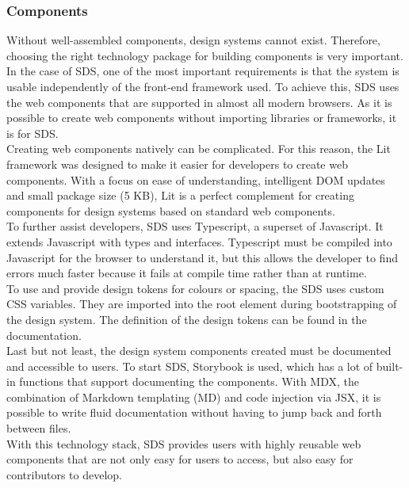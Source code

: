 \subsubsection*{Components} \label{sds-component}
Without well-assembled components, design systems cannot exist. Therefore, choosing the right technology package for building components is very important. 
In the case of SDS, one of the most important requirements is that the system is usable independently of the front-end framework used. To achieve this, SDS uses the web components that are supported in almost all modern browsers. As it is possible to create web components without importing libraries or frameworks, it is for SDS. \citep{mdn_web_component_nodate} \\
Creating web components natively can be complicated. For this reason, the Lit framework was designed to make it easier for developers to create web components. With a focus on ease of understanding, intelligent DOM updates and small package size (5 KB), Lit is a perfect complement for creating components for design systems based on standard web components. \citep{lit_nodate} \\
To further assist developers, SDS uses Typescript, a superset of Javascript. It extends Javascript with types and interfaces. Typescript must be compiled into Javascript for the browser to understand it, but this allows the developer to find errors much faster because it fails at compile time rather than at runtime. \citep{microsoft_typescript_nodate} \\
To use and provide design tokens for colours or spacing, the SDS uses custom CSS variables. They are imported into the root element during bootstrapping of the design system. The definition of the design tokens can be found in the documentation. \citep{mdn_css_vars_nodate} \\
Last but not least, the design system components created must be documented and accessible to users. To start SDS, Storybook is used, which has a lot of built-in functions that support documenting the components. With MDX, the combination of Markdown templating (MD) and code injection via JSX, it is possible to write fluid documentation without having to jump back and forth between files. \citep{otander_markdown_2017} \\
With this technology stack, SDS provides users with highly reusable web components that are not only easy for users to access, but also easy for contributors to develop. 
